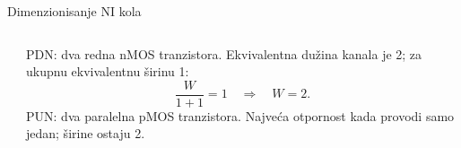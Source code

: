 \begin{frame}[label=09_3-s029]{Dimenzionisanje NI kola}
\begin{columns}[c,onlytextwidth]
\begin{center}

\end{center}
\alert{PDN:} dva redna nMOS tranzistora. Ekvivalentna dužina kanala je 2; za ukupnu ekvivalentnu širinu 1:
\[\frac W{1+1}=1\quad\Longrightarrow\quad W=2.\]
\alert{PUN:} dva paralelna pMOS tranzistora. Najveća otpornost kada provodi samo jedan; širine ostaju 2.
\end{columns}
\end{frame}
